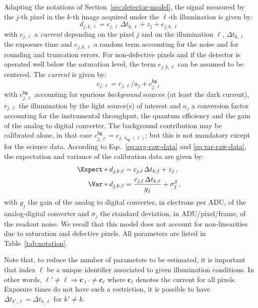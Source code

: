 \documentclass[a4paper,11pt,twoside]{scrartcl}
\newcommand*{\Tag}[1]{\mathsf{#1}}
\newcommand*{\V}[1]{\boldsymbol{#1}}   %
\theoremstyle{plain} %
\theoremstyle{definition}
\theoremstyle{remark}
\begin{document}
Adapting the notations of Section~\ref{sec:detector-model}, the signal measured
by the $j$-th pixel in the $k$-th image acquired under the $\ell$-th
illumination is given by:
\begin{equation}
  d_{j,k,\ell} = c_{j,\ell}\,\Delta t_{k,\ell} + z_j + e_{j,k,\ell}
  \label{eq:affine-model}
\end{equation}
with $c_{j,\ell}$ a \emph{current} depending on the pixel $j$ and on the
illumination $\ell$,  $\Delta t_{k,\ell}$ the exposure time and $e_{j,k,\ell}$
a random term accounting for the noise and for rounding and truncation errors.
For non-defective pixels and if the detector is operated well below the
saturation level, the term $e_{j,k,\ell}$ can be assumed to be centered. The
\emph{current} is given by:
\begin{equation}
  c_{j,\ell} = r_{j,\ell}/a_j + c^\Tag{bg}_{j,\ell}
  \label{eq:contributions}
\end{equation}
with $c^\Tag{bg}_{j,\ell}$ accounting for spurious \emph{background} sources
(at least the dark current), $r_{j,\ell}$ the illumination by the light
source(s) of interest and $a_j$ a conversion factor accounting for the
instrumental throughput, the quantum efficiency and the gain of the analog to
digital converter. The background contribution may be calibrated alone, in that
case $c^\Tag{bg}_{j,\ell} = c_{j,\ell_\Tag{bg}(\ell)}$; but this is not
mandatory except for the science data.  According to
Eqs.~\eqref{eq:avg-raw-data} and \eqref{eq:var-raw-data}, the expectation and
variance of the calibration data are given by:
\begin{align}
  \Expect*{d_{j,k,\ell}} &= c_{j,\ell}\,\Delta t_{k,\ell} + z_j \, ,\\
  \Var*{d_{j,k,\ell}}
  &= \frac{c_{j,\ell}\,\Delta t_{k,\ell}}{g_j} + \sigma_j^2 \, ,
\end{align}
with $g_j$ the gain of the analog to digital converter, in electrons per ADU,
of the analog-digital converter and $\sigma_j$ the standard deviation, in
ADU/pixel/frame, of the readout noise. We recall that this model does not
account for non-linearities due to saturation and defective pixels. All
parameters are listed in Table~\ref{tab:notation}.

Note that, to reduce the number of parameters to be estimated, it is important
that index $\ell$ be a unique identifier associated to given illumination
conditions. In other words, $\ell' \not= \ell \Rightarrow \V c_{\ell'} \not= \V
c_{\ell}$ where $\V c_{\ell}$ denotes the current for all pixels. Exposure
times do not have such a restriction, it is possible to have $\Delta t_{k',\ell}
= \Delta t_{k,\ell}$ for $k'\not=k$.
\end{document}
